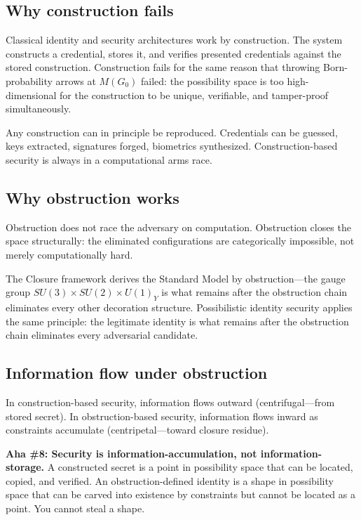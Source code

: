 \documentclass[11pt,a4paper]{article}
\theoremstyle{definition}
\theoremstyle{remark}
\newcommand{\aha}[2]{\medskip\textbf{Aha \##1: #2}}
\begin{document}
\subsection{Why construction fails}

Classical identity and security architectures work by construction. The system constructs a credential, stores it, and verifies presented credentials against the stored construction. Construction fails for the same reason that throwing Born-probability arrows at $M(G_0)$ failed: the possibility space is too high-dimensional for the construction to be unique, verifiable, and tamper-proof simultaneously.

Any construction can in principle be reproduced. Credentials can be guessed, keys extracted, signatures forged, biometrics synthesized. Construction-based security is always in a computational arms race.

\subsection{Why obstruction works}

Obstruction does not race the adversary on computation. Obstruction closes the space structurally: the eliminated configurations are categorically impossible, not merely computationally hard.

The Closure framework derives the Standard Model by obstruction---the gauge group $SU(3) \times SU(2) \times U(1)_Y$ is what remains after the obstruction chain eliminates every other decoration structure. Possibilistic identity security applies the same principle: the legitimate identity is what remains after the obstruction chain eliminates every adversarial candidate.

\subsection{Information flow under obstruction}

In construction-based security, information flows outward (centrifugal---from stored secret). In obstruction-based security, information flows inward as constraints accumulate (centripetal---toward closure residue).

\aha{8}{Security is information-accumulation, not information-storage.} A constructed secret is a point in possibility space that can be located, copied, and verified. An obstruction-defined identity is a shape in possibility space that can be carved into existence by constraints but cannot be located as a point. You cannot steal a shape.
\end{document}
